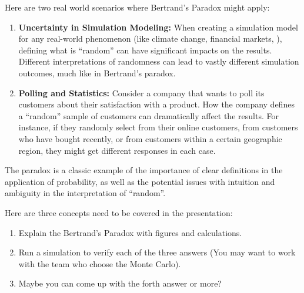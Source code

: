 \documentclass{article}
\begin{document}
Here are two real world scenarios where Bertrand's Paradox might apply:
\begin{enumerate}
    \item \textbf{Uncertainty in Simulation Modeling:} When creating a simulation model for any real-world phenomenon (like climate change, financial markets, \etc), defining what is ``random'' can have significant impacts on the results. Different interpretations of randomness can lead to vastly different simulation outcomes, much like in Bertrand's paradox.
    \item \textbf{Polling and Statistics:} Consider a company that wants to poll its customers about their satisfaction with a product. How the company defines a ``random'' sample of customers can dramatically affect the results. For instance, if they randomly select from their online customers, from customers who have bought recently, or from customers within a certain geographic region, they might get different responses in each case.
\end{enumerate}

The paradox is a classic example of the importance of clear definitions in the application of probability, as well as the potential issues with intuition and ambiguity in the interpretation of ``random''.

Here are three concepts need to be covered in the presentation:
\begin{enumerate}
    \item Explain the Bertrand's Paradox with figures and calculations.
    \item Run a simulation to verify each of the three answers (You may want to work with the team who choose the Monte Carlo).
    \item Maybe you can come up with the forth answer or more?
\end{enumerate}
\end{document}
